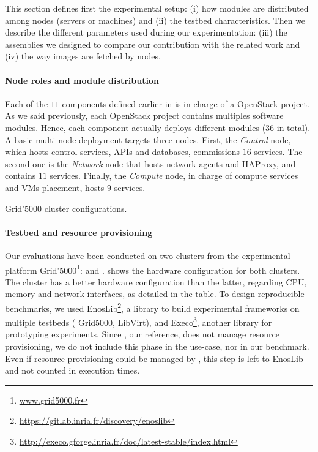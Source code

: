 This section defines first the experimental setup: (i) how modules are
distributed among nodes (\ie servers or machines) and (ii) the testbed
characteristics. Then we describe the different parameters used during
our experimentation: (iii) the assemblies we designed to compare our
contribution with the related work and (iv) the way \docker images are
fetched by nodes.

\paragraph{Node roles and module distribution}
Each of the $11$ components defined earlier in \kolla is in charge of
a OpenStack project. As we said previously, each OpenStack project
contains multiples software modules. Hence, each component actually
deploys different modules ($36$ in total). A basic multi-node \kolla
deployment targets three nodes. First, the \emph{Control} node, which
hosts control services, APIs and databases, commissions $16$
services. The second one is the \emph{Network} node that hosts network
agents and HAProxy, and contains $11$ services. Finally, the
\emph{Compute} node, in charge of compute services and VMs placement,
hosts $9$ services.

\begin{table}
  \begin{center}
    \small
    
    \caption{Grid'5000 cluster configurations.}
    \label{tab:g5k}
  \end{center}
\end{table}

\paragraph{Testbed and resource provisioning}
Our evaluations have been conducted on two clusters from the
experimental platform Grid'5000\footnote{\url{www.grid5000.fr}}:
\ecotype and \nova.  shows the hardware configuration
for both clusters. The cluster \ecotype has a better hardware
configuration than the latter, regarding CPU, memory and network
interfaces, as detailed in the table. To design reproducible
benchmarks, we used
EnosLib\footnote{\url{https://gitlab.inria.fr/discovery/enoslib}}, a
library to build experimental frameworks on multiple testbeds (\eg
Grid5000, LibVirt), and
Execo\footnote{\url{http://execo.gforge.inria.fr/doc/latest-stable/index.html}},
another library for prototyping experiments. Since \kolla, our
reference, does not manage resource provisioning, we do not include
this phase in the use-case, nor in our benchmark. Even if resource
provisioning could be managed by \mad, this step is left to EnosLib
and not counted in execution times.

